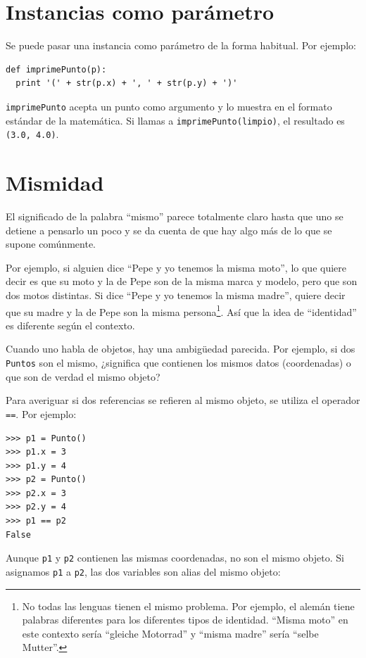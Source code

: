 
\section{Instancias como parámetro}

Se puede pasar una instancia como parámetro de la forma habitual.
Por ejemplo:

\beforeverb
\begin{verbatim}
def imprimePunto(p):
  print '(' + str(p.x) + ', ' + str(p.y) + ')'
\end{verbatim}
\afterverb
%
\texttt{imprimePunto} acepta un punto como argumento y lo muestra
en el formato estándar de la matemática. Si llamas a \texttt{imprimePunto(limpio)}, el
resultado es \texttt{(3.0, 4.0)}.


\section{Mismidad}

El significado de la palabra ``mismo'' parece totalmente claro hasta
que uno se detiene a pensarlo un poco y se da cuenta de que hay
algo más de lo que se supone comúnmente.


Por ejemplo, si alguien dice ``Pepe y yo tenemos la misma moto'', lo que quiere decir
es que su moto y la de Pepe son de la misma marca y modelo, pero que son dos motos
distintas. Si dice ``Pepe y yo tenemos la misma madre'', quiere decir que su madre
y la de Pepe son la misma persona\footnote{No todas las lenguas tienen el mismo
problema. Por ejemplo, el alemán tiene palabras diferentes para los diferentes
tipos de identidad. ``Misma moto'' en este contexto sería ``gleiche Motorrad'' y ``misma
madre'' sería ``selbe Mutter''.}. Así que la idea de ``identidad'' es diferente según
el contexto.

Cuando uno habla de objetos, hay una ambigüedad parecida. Por ejemplo,
si dos \texttt{Puntos} son el mismo, ¿significa que contienen los mismos datos
(coordenadas) o que son de verdad el mismo objeto?

Para averiguar si dos referencias se refieren al mismo objeto, se utiliza el
operador \texttt{==}. Por ejemplo:

\beforeverb
\begin{verbatim}
>>> p1 = Punto()
>>> p1.x = 3
>>> p1.y = 4
>>> p2 = Punto()
>>> p2.x = 3
>>> p2.y = 4
>>> p1 == p2
False
\end{verbatim}
\afterverb
%
Aunque \texttt{p1} y \texttt{p2} contienen las mismas coordenadas, no son
el mismo objeto. Si asignamos \texttt{p1} a \texttt{p2}, las dos variables son
alias del mismo objeto:

